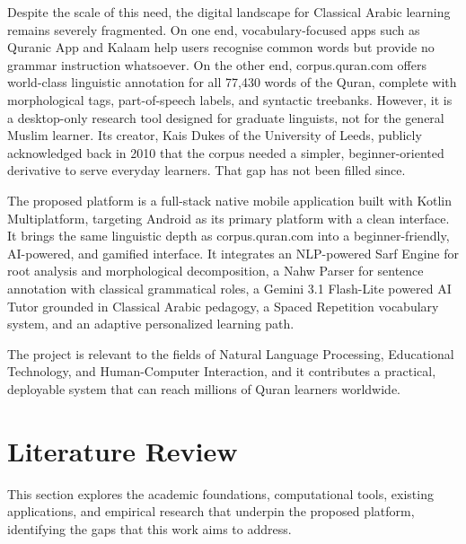 \documentclass[A4paper,12pt]{article}
\begin{document}
Despite the scale of this need, the digital landscape for Classical Arabic learning remains severely
fragmented. On one end, vocabulary-focused apps such as Quranic App and Kalaam help users
recognise common words but provide no grammar instruction whatsoever. On the other end,
corpus.quran.com offers world-class linguistic annotation for all 77,430 words of the Quran,
complete with morphological tags, part-of-speech labels, and syntactic treebanks. However, it
is a desktop-only research tool designed for graduate linguists, not for the general Muslim
learner. Its creator, Kais Dukes of the University of Leeds, publicly
acknowledged back in 2010 that the corpus needed a simpler, beginner-oriented derivative to
serve everyday learners. That gap has not been filled since.

The proposed platform is a full-stack native mobile application built with Kotlin Multiplatform,
targeting Android as its primary platform with a clean interface. It brings
the same linguistic depth as corpus.quran.com into a beginner-friendly, AI-powered, and gamified
interface. It integrates an NLP-powered Sarf Engine for root analysis and morphological
decomposition, a Nahw Parser for sentence annotation with classical grammatical roles, a Gemini
3.1 Flash-Lite powered AI Tutor grounded in Classical Arabic pedagogy, a Spaced Repetition
vocabulary system, and an adaptive personalized learning path.

The project is relevant to the fields of Natural Language Processing, Educational Technology, and
Human-Computer Interaction, and it contributes a practical, deployable system that can reach
millions of Quran learners worldwide.



\section{Literature Review}

This section explores the academic foundations, computational tools, existing applications, and
empirical research that underpin the proposed platform, identifying the gaps that this work aims
to address.
\end{document}
